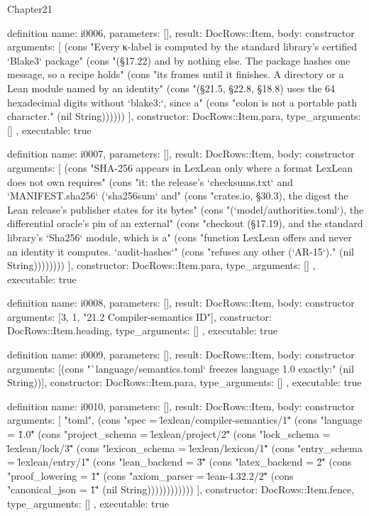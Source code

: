 \begin{lexlean}{Chapter21}
\begin{semanticmodule}
definition{
  name: i0006,
  parameters: [],
  result: DocRows::Item,
  body: constructor{
    arguments: [
      (cons "Every κ-label is computed by the standard library's certified `Blake3` package" (cons "(§17.22) and by nothing else. The package hashes one message, so a recipe holds" (cons "its frames until it finishes. A directory or a Lean module named by an identity" (cons "(§21.5, §22.8, §18.8) uses the 64 hexadecimal digits without `blake3:`, since a" (cons "colon is not a portable path character." (nil String))))))
    ],
    constructor: DocRows::Item.para,
    type_arguments: []
  },
  executable: true
}

definition{
  name: i0007,
  parameters: [],
  result: DocRows::Item,
  body: constructor{
    arguments: [
      (cons "SHA-256 appears in LexLean only where a format LexLean does not own requires" (cons "it: the release's `checksums.txt` and `MANIFEST.sha256` (`sha256sum` and" (cons "crates.io, §30.3), the digest the Lean release's publisher states for its bytes" (cons "(`model/authorities.toml`), the differential oracle's pin of an external" (cons "checkout (§17.19), and the standard library's `Sha256` module, which is a" (cons "function LexLean offers and never an identity it computes. `audit-hashes`" (cons "refuses any other (`AR-15`)." (nil String))))))))
    ],
    constructor: DocRows::Item.para,
    type_arguments: []
  },
  executable: true
}

definition{
  name: i0008,
  parameters: [],
  result: DocRows::Item,
  body: constructor{
    arguments: [3, 1, "21.2 Compiler-semantics ID"],
    constructor: DocRows::Item.heading,
    type_arguments: []
  },
  executable: true
}

definition{
  name: i0009,
  parameters: [],
  result: DocRows::Item,
  body: constructor{
    arguments: [(cons "`language/semantics.toml` freezes language 1.0 exactly:" (nil String))],
    constructor: DocRows::Item.para,
    type_arguments: []
  },
  executable: true
}

definition{
  name: i0010,
  parameters: [],
  result: DocRows::Item,
  body: constructor{
    arguments: [
      "toml",
      (cons "spec = \"lexlean/compiler-semantics/1\"" (cons "language = \"1.0\"" (cons "project_schema = \"lexlean/project/2\"" (cons "lock_schema = \"lexlean/lock/3\"" (cons "lexicon_schema = \"lexlean/lexicon/1\"" (cons "entry_schema = \"lexlean/entry/1\"" (cons "lean_backend = \"3\"" (cons "latex_backend = \"2\"" (cons "proof_lowering = \"1\"" (cons "axiom_parser = \"lean-4.32.2/2\"" (cons "canonical_json = \"1\"" (nil String))))))))))))
    ],
    constructor: DocRows::Item.fence,
    type_arguments: []
  },
  executable: true
}


\end{semanticmodule}
\end{lexlean}
